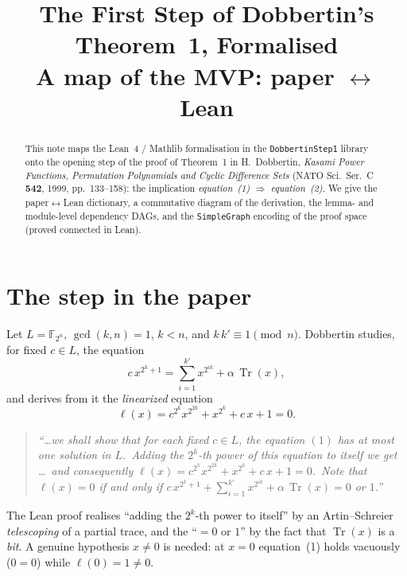 \documentclass[11pt]{article}
\title{\bfseries The First Step of Dobbertin's Theorem~1, Formalised\\[2pt]
  \large A map of the \lc{DobbertinStep1} MVP: paper $\leftrightarrow$ Lean}
\author{}
\date{}
\newcommand{\lc}[1]{\texttt{#1}}
\newcommand{\Tr}{\operatorname{Tr}}
\begin{document}
\maketitle

\begin{abstract}
This note maps the Lean~4 / Mathlib formalisation in the \lc{DobbertinStep1}
library onto the opening step of the proof of Theorem~1 in H.~Dobbertin,
\emph{Kasami Power Functions, Permutation Polynomials and Cyclic Difference
Sets} (NATO Sci.\ Ser.\ C \textbf{542}, 1999, pp.~133--158): the implication
\emph{equation~(1)} $\Rightarrow$ \emph{equation~(2)}.  We give the
paper$\leftrightarrow$Lean dictionary, a commutative diagram of the derivation,
the lemma- and module-level dependency DAGs, and the \lc{SimpleGraph} encoding of
the proof space (proved connected in Lean).
\end{abstract}

\section{The step in the paper}
Let $L=\mathbb{F}_{2^n}$, $\gcd(k,n)=1$, $k<n$, and $k\,k'\equiv 1\pmod n$.
Dobbertin studies, for fixed $c\in L$, the equation
\begin{equation}
  c\,x^{2^k+1}=\sum_{i=1}^{k'}x^{2^{ik}}+\alpha\,\Tr(x),\tag{1}
\end{equation}
and derives from it the \emph{linearized} equation
\begin{equation}
  \ell(x)=c^{2^k}x^{2^{2k}}+x^{2^k}+c\,x+1=0.\tag{2}
\end{equation}

\begin{quote}\itshape\small
``\dots we shall show that for each fixed $c\in L$, the equation $(1)$ has at
most one solution in $L$.\ Adding the $2^k$-th power of this equation to itself
we get \dots\ and consequently $\ell(x)=c^{2^k}x^{2^{2k}}+x^{2^k}+c\,x+1=0$.\
Note that $\ell(x)=0$ if and only if
$c\,x^{2^k+1}+\sum_{i=1}^{k'}x^{2^{ik}}+\alpha\,\Tr(x)=0$ or $1$.''
\end{quote}

The Lean proof realises ``adding the $2^k$-th power to itself'' by an
Artin--Schreier \emph{telescoping} of a partial trace, and the ``$=0$ or $1$'' by
the fact that $\Tr(x)$ is a \emph{bit}.  A genuine hypothesis $x\neq0$ is needed:
at $x=0$ equation~(1) holds vacuously ($0=0$) while $\ell(0)=1\neq0$.
\end{document}

